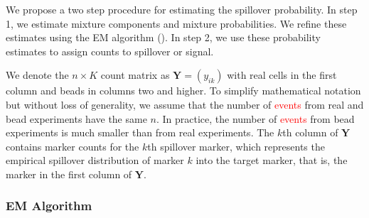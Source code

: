 \documentclass[
]{article}
\begin{document}
We propose a two step procedure for estimating the spillover probability. In step 1, we estimate mixture components and mixture probabilities. We refine these estimates using the EM algorithm (). In step 2, we use these probability estimates to assign counts to spillover or signal.

We denote the \(n \times K\) count matrix as \(\mathbf{Y} = (y_{ik})\) with real cells in the first column and beads in columns two and higher. To simplify mathematical notation but without loss of generality, we assume that the number of
\textcolor{red}{events}
from real and bead experiments have the same \(n\). In practice, the number of
\textcolor{red}{events}
from bead experiments is much smaller than from real experiments. The \(k\)th column of \(\mathbf{Y}\) contains marker counts for the \(k\)th spillover marker, which represents the empirical spillover distribution of marker \(k\) into the target marker, that is, the marker in the first column of \(\mathbf{Y}\).

\subsubsection{EM Algorithm}\label{em-algorithm}
\end{document}
